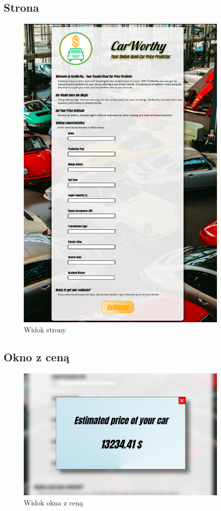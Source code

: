 \documentclass[12pt, a4paper]{report}
\begin{document}
\subsection{Strona}
\begin{figure}[H]
    \centering
    \includegraphics[width=0.9\textwidth]{images/page_view}
    \caption{Widok strony}
\end{figure}
\subsection{Okno z ceną}
\begin{figure}[H]
    \centering
    \includegraphics[width=0.9\textwidth]{images/price_view}
    \caption{Widok okna z ceną}
\end{figure}
\end{document}
